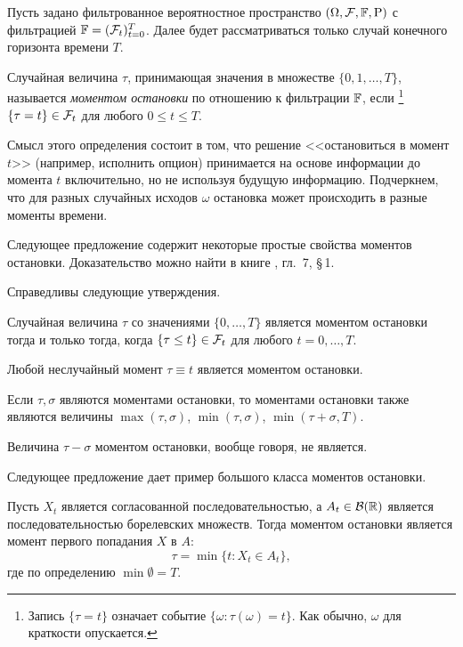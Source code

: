 Пусть задано фильтрованное вероятностное пространство $(\Omega,\mathcal{F},\mathbb{F},\mathrm{P})$ с фильтрацией $\mathbb{F}=(\mathcal{F}_t)_{t=0}^T$.
Далее будет рассматриваться только случай конечного горизонта времени $T$.

\begin{definition}
Случайная величина $\tau$, принимающая значения в множестве $\{0,1,\dots,T\}$, называется \emph{моментом остановки} по отношению к фильтрации $\mathbb{F}$, если%
\footnote{Запись $\{\tau=t\}$ означает событие $\{\omega: \tau(\omega) = t\}$.
Как обычно, $\omega$ для краткости опускается.}
$\{\tau= t\} \in \mathcal{F}_t$ для любого $0\le t \le T$.
\end{definition}

Смысл этого определения состоит в том, что решение <<остановиться в момент $t$>> (например, исполнить опцион) принимается на основе информации до момента $t$ включительно, но не используя будущую информацию.
Подчеркнем, что для разных случайных исходов $\omega$ остановка может происходить в разные моменты времени.

Следующее предложение содержит некоторые простые свойства моментов остановки.
Доказательство можно найти в книге \cite{Shiryaev04}, гл.~7, \S\,1.

\begin{proposition}
Справедливы следующие утверждения.
\begin{alphenum}
\item Случайная величина $\tau$ со значениями $\{0,\dots,T\}$ является моментом остановки тогда и только тогда, когда $\{\tau\le t\} \in \mathcal{F}_t$ для любого $t=0,\dots,T$.

\item Любой неслучайный момент $\tau\equiv t$ является моментом остановки.

\item Если $\tau, \sigma$ являются моментами остановки, то моментами остановки также являются величины $\max(\tau,\sigma)$, $\min(\tau,\sigma)$, $\min(\tau+\sigma,T)$.
\end{alphenum}
\end{proposition}

\begin{remark}
Величина $\tau-\sigma$ моментом остановки, вообще говоря, не является.
\end{remark}

Следующее предложение дает пример большого класса моментов остановки.

\begin{proposition}
\label{5:hitting-time}
Пусть $X_t$ является согласованной последовательностью, а $A_t\in \mathcal{B}(\mathbb{R})$ является последовательностью борелевских множеств.
Тогда моментом остановки является момент первого попадания $X$ в $A$:
\[
\tau = \min\{t : X_t \in A_t\},
\]
где по определению $\min\emptyset = T$.
\end{proposition}

